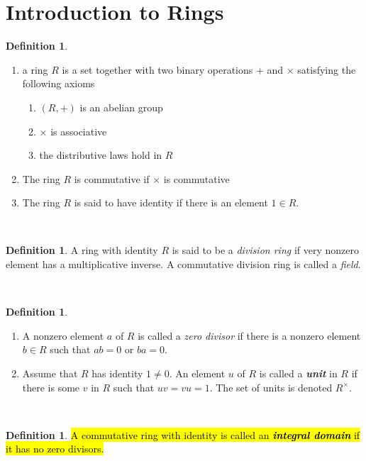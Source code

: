 \documentclass{article}
\theoremstyle{definition}
\newtheorem{defn}[thm]{Definition}
\newcommand{\nl}{\textcolor{white}{nothing}}
\begin{document}
\section{Introduction to Rings}

\setcounter{thm}{0}

\begin{defn}\nl
\begin{enumerate}
\item a ring $R$ is a set together with two binary operations $+$ and $\times$ satisfying the following axioms
\begin{enumerate}
\item $(R, +)$ is an abelian group 
\item $\times$ is associative 
\item the distributive laws hold in $R$
\end{enumerate}
\item The ring $R$ is commutative if $\times$ is commutative
\item The ring $R$ is said to have identity if there is an element $1\in R$.
\end{enumerate}

\end{defn}

\nl

\begin{defn}
A ring with identity $R$ is said to be a \textit{division ring} if very nonzero element has a multiplicative inverse. A commutative division ring is called a \textit{field}.
\end{defn}

\nl

\begin{defn}\nl
\begin{enumerate}
\item A nonzero element $a$ of $R$ is called a \textit{zero divisor} if there is a nonzero element $b\in R$ such that $ab = 0$ or $ba = 0$.
\item Assume that $R$ has identity $1\neq 0$. An element $u$ of $R$ is called a \textit{\textbf{unit}} in $R$ if there is some $v$ in $R$ such that $uv=vu=1$. The set of units is denoted $R^\times$.
\end{enumerate}
\end{defn}

\nl

\begin{defn}
\hl{A commutative ring with identity is called an \textit{\textbf{integral domain}} if it has no zero divisors.}
\end{defn}
\end{document}
